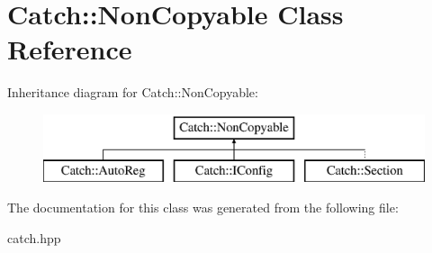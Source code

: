 \hypertarget{classCatch_1_1NonCopyable}{}\section{Catch\+::Non\+Copyable Class Reference}
\label{classCatch_1_1NonCopyable}
Inheritance diagram for Catch\+::Non\+Copyable\+:\begin{figure}[H]
\begin{center}
\leavevmode
\includegraphics[height=2.000000cm]{classCatch_1_1NonCopyable}
\end{center}
\end{figure}


The documentation for this class was generated from the following file\+:\begin{DoxyCompactItemize}
\item 
catch.\+hpp\end{DoxyCompactItemize}
